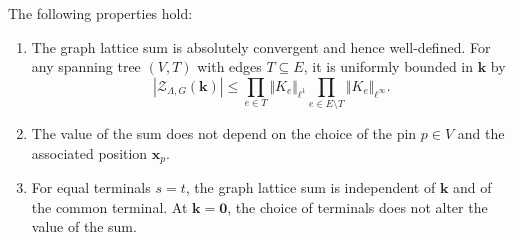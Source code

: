 \documentclass[]{amsart}
\numberwithin{mythm}{section}
\begin{document}
\begin{lemma}
\label{lem:choice_of_x}
The following properties hold:
\begin{enumerate}
\item The graph lattice sum is absolutely convergent and hence well-defined. For any spanning tree $(V,T)$ with edges $T\subseteq E$, it is uniformly bounded in $\bm k$ by
\[
|{\mathcal Z}_{\Lambda,G}(\bm k)|\le
\prod_{e\in T} \Vert K_e\Vert_{\ell^1}
\prod_{e\in E\setminus T} \Vert K_e\Vert_{\ell^\infty}.
\]
\item The value of the sum does not depend on the choice of the pin $p\in V$ and the associated position $\bm x_p$.
\item For equal terminals $s=t$, the graph lattice sum is independent of $\bm k$ and of the common terminal. At $\bm k=\bm 0$, the choice of terminals does not alter the value of the sum. 
\end{enumerate}
\end{lemma}
\end{document}
